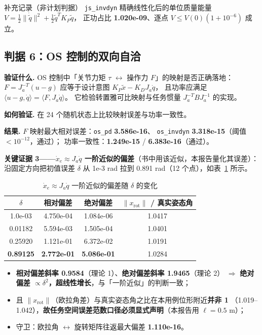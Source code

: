 \documentclass[11pt,a4paper]{ctexart}
\begin{document}
\begin{keybox}{补充记录（非计划判据）}
\texttt{js\_invdyn} 精确线性化后的单位质量能量
$V=\frac12\|\dot{\tilde q}\|^2+\frac12\tilde q^{T}K_P\tilde q$，
正功占比 \textbf{1.020e-09}、逐点 $V\le V(0)(1+10^{-6})$ 成立。
\end{keybox}

\subsection{判据 6：OS 控制的双向自洽}

\textbf{验证什么.} OS 控制中「关节力矩 $\tau$ $\leftrightarrow$ 操作力 $F$」的映射是否正确落地：
$F=J_a^{-T}(u-g)$ 应等于设计意图 $K_P\tilde x-K_DJ_a\dot q$，
且功率应满足 $\langle u-g,\dot q\rangle=\langle F,J_a\dot q\rangle$。
它检验转置雅可比映射与任务惯量 $J_a^{-T}BJ_a^{-1}$ 的实现。

\textbf{如何验证.} 在 24 个随机状态上比较映射误差与功率一致性。

\textbf{结果.} $F$ 映射最大相对误差：\texttt{os\_pd} \textbf{3.586e-16}、
\texttt{os\_invdyn} \textbf{3.318e-15}（阈值 $<10^{-12}$，通过）；
功率一致性：\textbf{1.249e-15} / \textbf{6.383e-16}（通过）。

\textbf{关键证据 3——$\dot x_e\approx J_a\dot q$ 一阶近似的偏差}（书中用该近似，本报告量化其误差）：
沿固定方向把初值误差 $\delta$ 从 1e-3 rad 拉到 0.891 rad（12 个点），如表~\ref{tab:linbias} 所示。

\begin{table}[H]
\centering
\small
\caption{$\dot x_e\approx J_a\dot q$ 一阶近似的偏差随 $\delta$ 的变化}\label{tab:linbias}
\begin{tabular}{@{}cccc@{}}
\toprule
$\delta$ & 相对偏差 & 绝对偏差 & $\|x_{\mathrm{rot}}\|$ / 真实姿态角 \\
\midrule
1.0e-03 & 4.750e-04 & 1.084e-06 & 1.0417 \\
0.01182 & 5.594e-03 & 1.505e-04 & 1.0401 \\
0.25920 & 1.121e-01 & 6.372e-02 & 1.0191 \\
\textbf{0.89125} & \textbf{2.772e-01} & \textbf{5.086e-01} & 1.0284 \\
\bottomrule
\end{tabular}
\end{table}

\begin{itemize}[leftmargin=1.6em,itemsep=2pt]
\item \textbf{相对偏差斜率 0.9584}（理论 1）、\textbf{绝对偏差斜率 1.9465}（理论 2）
  $\Rightarrow$ \textbf{绝对偏差 $\propto\delta^2$，超线性增长}，与「一阶近似」的判断一致；
\item 且 $\|x_{\mathrm{rot}}\|$（欧拉角差）与真实姿态角之比在本用例位形附近\textbf{并非 1}
  （1.019--1.042），\textbf{故任务空间误差范数口径必须显式声明}（本报告用 $\ell=0.5$ m）；
\item 守卫：欧拉角 $\leftrightarrow$ 旋转矩阵往返最大偏差 \textbf{1.110e-16}。
\end{itemize}
\end{document}
